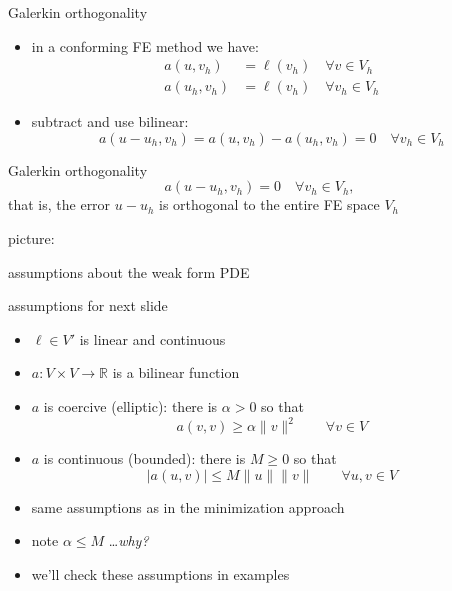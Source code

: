 \documentclass[10pt,
               svgnames,
               hyperref={colorlinks,
                         citecolor=DeepPink4,
                         linkcolor=FireBrick,
                         urlcolor=blue},
               usepdftitle=false]{beamer}
\newcommand{\RR}{\mathbb{R}}
\begin{document}
\begin{frame}{Galerkin orthogonality}

\begin{itemize}
\item in a conforming FE method we have:
\begin{align*}
a(u,v_h) &= \ell(v_h) \quad \forall v\in V_h \\
a(u_h,v_h) &= \ell(v_h) \quad \forall v_h\in V_h
\end{align*}
\item subtract and use bilinear:
   $$a(u-u_h,v_h) = a(u,v_h) - a(u_h,v_h) = 0 \quad \forall v_h\in V_h$$
\end{itemize}

\begin{block}{Galerkin orthogonality}
   $$a(u-u_h,v_h) = 0 \quad \forall v_h\in V_h,$$
that is, \alert{the error $u-u_h$ is orthogonal to the entire FE space $V_h$}
\end{block}

picture:

\vspace{20mm}
\end{frame}


\begin{frame}{assumptions about the weak form PDE}

\begin{block}{assumptions for next slide}
\begin{itemize}
\item $\ell\in V'$ is linear and continuous
\item $a:V\times V\to \RR$ is a bilinear function
\item $a$ is coercive (elliptic): there is $\alpha>0$ so that
	$$a(v,v) \ge \alpha \|v\|^2 \qquad \forall v \in V$$
\item $a$ is continuous (bounded): there is $M\ge 0$ so that
	$$|a(u,v)| \le M \|u\|\|v\| \qquad \forall u,v \in V$$
\end{itemize}
\end{block}

\begin{itemize}
\item same assumptions as in the minimization approach
\item note $\alpha \le M$ \dots \emph{why?}
\item we'll check these assumptions in examples
\end{itemize}
\end{frame}
\end{document}
